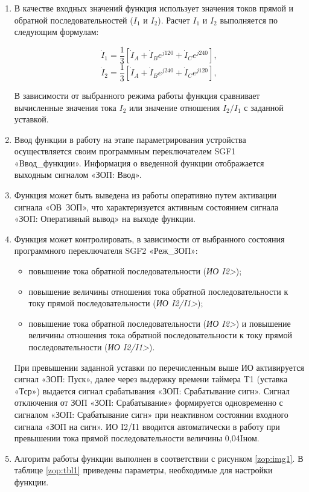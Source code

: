 \begin{enumerate}
\item
В качестве входных значений функция использует значения токов прямой и обратной последовательностей ($I_1$ и $I_2$). Расчет $I_1$ и $I_2$ выполняется по следующим формулам:

\begin{equation*}
    \dot{I}_1=\frac{1}{3}\left[\dot{I}_A+\dot{I}_Be^{j120}+\dot{I}_Ce^{j240}\right],
\end{equation*}
\begin{equation*}
    \dot{I}_2=\frac{1}{3}\left[\dot{I}_A+\dot{I}_Be^{j240}+\dot{I}_Ce^{j120}\right],
\end{equation*}

В зависимости от выбранного режима работы функция сравнивает вычисленные значения тока $I_2$ или значение отношения $I_2/I_1$ с заданной уставкой.

\item
Ввод функции в работу на этапе параметрирования устройства осуществляется своим программным переключателем SGF1 «Ввод\_функции». Информация о введенной функции отображается выходным сигналом «ЗОП: Ввод».
\item
Функция может быть выведена из работы оперативно путем активации сигнала «ОВ~ЗОП», что характеризуется активным состоянием сигнала «ЗОП: Оперативный вывод» на выходе функции.
\item
Функция может контролировать, в зависимости от выбранного состояния программного переключателя SGF2 «Реж\_ЗОП»:
\begin{itemize}
 \item повышение тока обратной последовательности (\textsl{ИО I2>}); 
 \item повышение величины отношения тока обратной последовательности к току прямой последовательности (\textsl{ИО I2/I1>});
 \item повышение тока обратной последовательности (\textsl{ИО I2>}) и повышение величины отношения тока обратной последовательности к току прямой последовательности (\textsl{ИО I2/I1>}).
\end{itemize}
 При превышении заданной уставки по перечисленным выше ИО активируется сигнал «ЗОП: Пуск», далее через выдержку времени таймера T1 (уставка «Тср») выдается сигнал срабатывания «ЗОП: Срабатывание сигн». Сигнал отключения от ЗОП «ЗОП: Срабатывание» формируется одновременно с сигналом «ЗОП: Срабатывание сигн» при неактивном состоянии входного сигнала «ЗОП на сигн». ИО I2/I1 вводится автоматически в работу при превышении тока прямой последовательности величины 0,04Iном.
\item
Алгоритм работы функции выполнен в соответствии с рисунком \ref{zop:img1}. В таблице \ref{zop:tbl1} приведены параметры, необходимые для настройки функции.


\end{enumerate}
